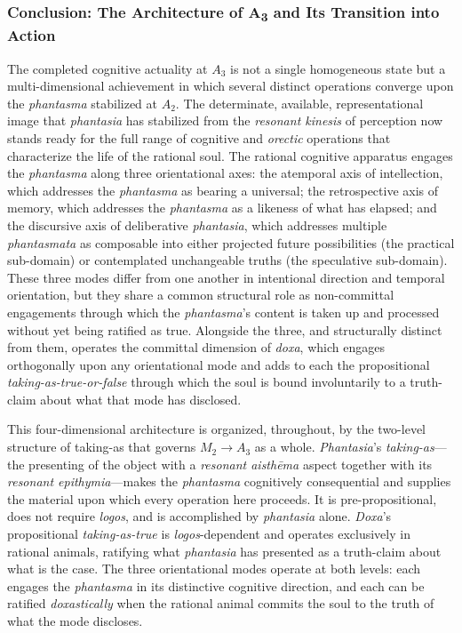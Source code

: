 \documentclass{article}
\begin{document}
\subsubsection*{Conclusion: The Architecture of A\textsubscript{3} and Its Transition into Action}

The completed cognitive actuality at $A_3$ is not a single homogeneous state but a multi-dimensional achievement in which several distinct operations converge upon the \textit{phantasma} stabilized at $A_2$. The determinate, available, representational image that \textit{phantasia} has stabilized from the \textit{resonant kinesis} of perception now stands ready for the full range of cognitive and \textit{orectic} operations that characterize the life of the rational soul. The rational cognitive apparatus engages the \textit{phantasma} along three orientational axes: the atemporal axis of intellection, which addresses the \textit{phantasma} as bearing a universal; the retrospective axis of memory, which addresses the \textit{phantasma} as a likeness of what has elapsed; and the discursive axis of deliberative \textit{phantasia}, which addresses multiple \textit{phantasmata} as composable into either projected future possibilities (the practical sub-domain) or contemplated unchangeable truths (the speculative sub-domain). These three modes differ from one another in intentional direction and temporal orientation, but they share a common structural role as non-committal engagements through which the \textit{phantasma}'s content is taken up and processed without yet being ratified as true. Alongside the three, and structurally distinct from them, operates the committal dimension of \textit{doxa}, which engages orthogonally upon any orientational mode and adds to each the propositional \textit{taking-as-true-or-false} through which the soul is bound involuntarily to a truth-claim about what that mode has disclosed.

This four-dimensional architecture is organized, throughout, by the two-level structure of taking-as that governs $M_2 \rightarrow A_3$ as a whole. \textit{Phantasia}'s \textit{taking-as}---the presenting of the object with a \textit{resonant aisthēma} aspect together with its \textit{resonant epithymia}---makes the \textit{phantasma} cognitively consequential and supplies the material upon which every operation here proceeds. It is pre-propositional, does not require \textit{logos}, and is accomplished by \textit{phantasia} alone. \textit{Doxa}'s propositional \textit{taking-as-true} is \textit{logos}-dependent and operates exclusively in rational animals, ratifying what \textit{phantasia} has presented as a truth-claim about what is the case. The three orientational modes operate at both levels: each engages the \textit{phantasma} in its distinctive cognitive direction, and each can be ratified \textit{doxastically} when the rational animal commits the soul to the truth of what the mode discloses. 
\end{document}
